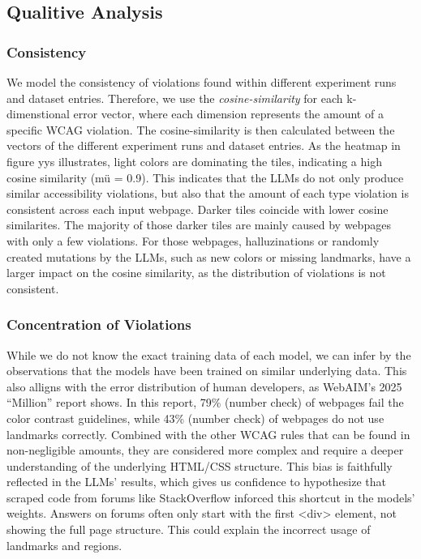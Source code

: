 \subsection{Qualitive Analysis}
\subsubsection{Consistency}
We model the consistency of violations found within different 
experiment runs and dataset entries. Therefore, we use the \textit{cosine-similarity} for 
each k-dimenstional error vector, where each dimension represents the amount of a specific 
WCAG violation. The cosine-similarity is then calculated between the vectors of the 
different experiment runs and dataset entries. As the heatmap in figure yys illustrates,
light colors are dominating the tiles, indicating a high cosine similarity (mü = 0.9). This 
indicates that the LLMs do not only produce similar accessibility violations, but also that 
the amount of each type violation is consistent across each input webpage. Darker tiles 
coincide with lower cosine similarites. The majority of those darker tiles are mainly caused 
by webpages with only a few violations. For those webpages, halluzinations or randomly 
created mutations by the LLMs, such 
as new colors or missing landmarks, have a larger impact on the cosine similarity, as 
the distribution of violations is not consistent. 




\subsubsection{Concentration of Violations}
While we do not know 
the exact training data of each model, we can infer by the observations that the 
models have been trained on similar underlying data. This also alligns with the 
error distribution of human developers, as WebAIM’s 2025 “Million” report shows.
In this report, 79\% (number check) of webpages fail the color contrast guidelines,
while 43\% (number check) of webpages do not use landmarks correctly. 
Combined with the other WCAG rules that can be found in non-negligible amounts, 
they are considered more complex and require a deeper understanding of the 
underlying HTML/CSS structure. \newline
This bias is faithfully reflected in the LLMs'
results, which gives us confidence to hypothesize that scraped code from 
forums like StackOverflow inforced this shortcut in the models' weights. 
Answers on forums often only start with the first <div> element, not showing 
the full page structure. This could explain the incorrect usage of landmarks and 
regions.

